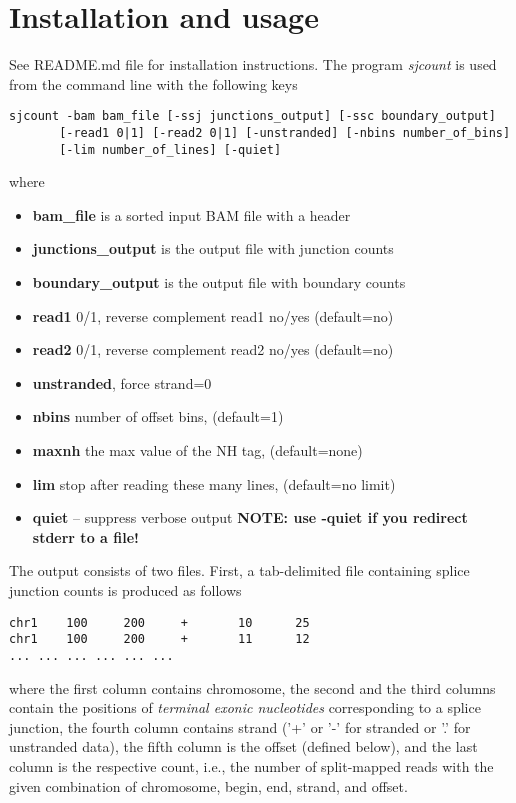 \documentclass{article}
\begin{document}
\section{Installation and usage}
See README.md file for installation instructions. The program {\em sjcount} is used from the command line with the following keys
\begin{verbatim}
sjcount -bam bam_file [-ssj junctions_output] [-ssc boundary_output]
       [-read1 0|1] [-read2 0|1] [-unstranded] [-nbins number_of_bins]
       [-lim number_of_lines] [-quiet]
\end{verbatim}
where
\begin{itemize}
\item {\bf bam\_file} is a sorted input BAM file with a header
\item {\bf junctions\_output} is the output file with junction counts
\item {\bf boundary\_output} is the output file with boundary counts
\item {\bf read1} 0/1, reverse complement read1 no/yes (default=no)
\item {\bf read2} 0/1, reverse complement read2 no/yes (default=no)
\item {\bf unstranded}, force strand=0
\item {\bf nbins} number of offset bins, (default=1)
\item {\bf maxnh} the max value of the NH tag, (default=none)
\item {\bf lim} stop after reading these many lines, (default=no limit)
\item {\bf quiet} -- suppress verbose output {\bf NOTE: use -quiet if you redirect stderr to a file!}
\end{itemize}

The output consists of two files. First, a tab-delimited file containing splice junction counts is produced as follows
\begin{verbatim}
chr1    100     200     +       10      25
chr1    100     200     +       11      12
...	...	...	...	...	...
\end{verbatim}
where the first column contains chromosome, the second and the third columns contain the positions of {\em terminal 
exonic nucleotides} corresponding to a splice junction, the fourth column contains strand ('+' or '-' for stranded 
or '.' for unstranded data), the fifth column is the offset (defined below), and the last column is the respective 
count, i.e., the number of split-mapped reads with the given combination of chromosome, begin, end, strand, and 
offset.
\end{document}
